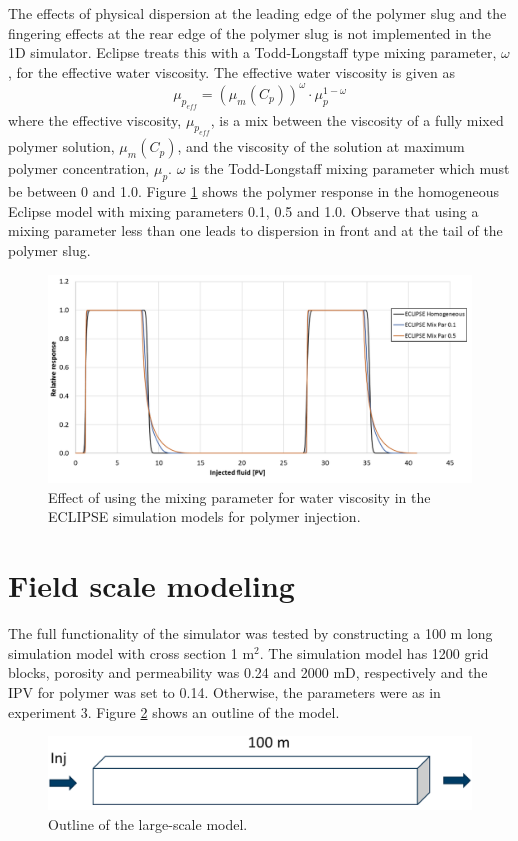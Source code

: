\documentclass[journal = enfuem, manuscript =  article]{achemso}
\begin{document}
The effects of physical dispersion at the leading edge of the polymer slug and the fingering effects at the rear edge of the polymer slug is not implemented in the 1D simulator. Eclipse treats this with a Todd-Longstaff type mixing parameter,  $\omega$, for the effective water viscosity. The effective water viscosity is given as
\begin{equation}
    \mu_{p_\textit{eff}} = (\mu_m(C_p))^\omega \cdot \mu_p^{1-\omega}
\end{equation}
where the effective viscosity,  $\mu_{p_\textit{eff}}$, is a mix between the viscosity of a fully mixed polymer solution,  $\mu_m(C_p)$, and the viscosity of the solution at maximum polymer concentration,  $\mu_p$.  $\omega$ is the Todd-Longstaff mixing parameter which must be between 0 and 1.0. Figure \ref{cht:simEclMix} shows the polymer response in the homogeneous Eclipse model with mixing parameters 0.1, 0.5 and 1.0. Observe that using a mixing parameter less than one leads to dispersion in front and at the tail of the polymer slug.

\begin{figure}
    \centering
    \includegraphics[width=\textwidth]{fig/simEclMix.png}
    \caption{Effect of using the mixing parameter for water viscosity in the ECLIPSE simulation models for polymer injection. }
    \label{cht:simEclMix}
\end{figure}

\section{Field scale modeling}
The full functionality of the simulator was tested by constructing a 100 m long simulation model with cross section 1 m$^2$. The simulation model has 1200 grid blocks, porosity and permeability was 0.24 and 2000 mD, respectively and the  IPV for polymer was set to 0.14. Otherwise, the parameters were as in experiment 3. Figure \ref{fig:largeScaleModel} shows an outline of the model.
\begin{figure}[h]
    \centering
    \includegraphics[width=\textwidth]{fig/largeScaleModel.png}
    \caption{Outline of the large-scale model. }
    \label{fig:largeScaleModel}
\end{figure}
\end{document}
